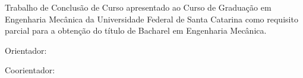 \begin{folhaderosto}

\begin{center}
    \vspace*{2.4cm}
    {\normalsize\MakeUppercase{\autorTCC}\par}
\end{center}

\vspace*{4.6cm}

\begin{flushright}
    \begin{minipage}{0.50\textwidth}
        \OnehalfSpacing
        Trabalho de Conclusão de Curso apresentado ao Curso de Graduação em Engenharia Mecânica da Universidade Federal de Santa Catarina como requisito parcial para a obtenção do título de Bacharel em Engenharia Mecânica.

        \vspace{0.8cm}
        Orientador: \orientadorTCC

        \vspace{0.45cm}
        Coorientador: \coorientadorTCC
    \end{minipage}
\end{flushright}

\vfill
\begin{center}
    {\normalsize \cidadeTCC\par}
    {\normalsize \anoTCC\par}
\end{center}

\end{folhaderosto}
